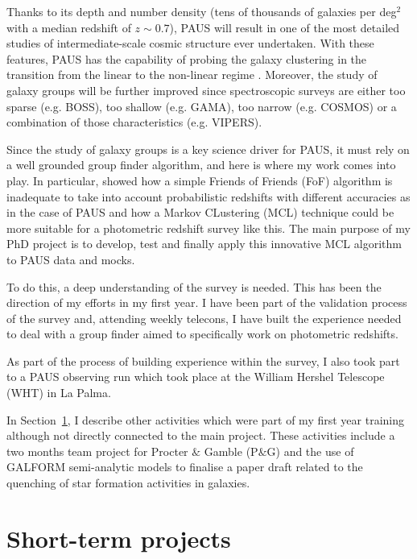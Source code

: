 \documentclass[11pt]{article}
\begin{document}
Thanks to its depth and number density (tens of thousands of galaxies per deg$^2$ with a median redshift of $z \sim 0.7$), PAUS will result in one of the most detailed studies of intermediate-scale cosmic structure ever undertaken. With these features, PAUS has the capability of probing the galaxy clustering in the transition from the linear to the non-linear regime \citep{stothert18_thesis}. Moreover, the study of galaxy groups will be further improved since spectroscopic surveys are either too sparse (e.g. BOSS), too shallow (e.g. GAMA), too narrow (e.g. COSMOS) or a combination of those characteristics (e.g. VIPERS).

Since the study of galaxy groups is a key science driver for PAUS, it must rely on a well grounded group finder algorithm, and here is where my work comes into play. In particular, \cite{stothert18_thesis} showed how a simple Friends of Friends (FoF) algorithm is inadequate to take into account probabilistic redshifts with different accuracies as in the case of PAUS and how a Markov CLustering (MCL) technique could be more suitable for a photometric redshift survey like this. The main purpose of my PhD project is to develop, test and finally apply this innovative MCL algorithm to PAUS data and mocks. 

To do this, a deep understanding of the survey is needed. This has been the direction of my efforts in my first year. I have been part of the validation process of the survey and, attending weekly telecons, I have built the experience needed to deal with a group finder aimed to specifically work on photometric redshifts. 

As part of the process of building experience within the survey, I also took part to a PAUS observing run which took place at the William Hershel Telescope (WHT) in La Palma. 

In Section~\ref{sec:short}, I describe other activities which were part of my first year training although not directly connected to the main project. These activities include a two months team project for Procter $\&$ Gamble (P$\&$G) and the use of GALFORM semi-analytic models to finalise a paper draft related to the quenching of star formation activities in galaxies.

\section{Short-term projects}
\label{sec:short}
\end{document}
